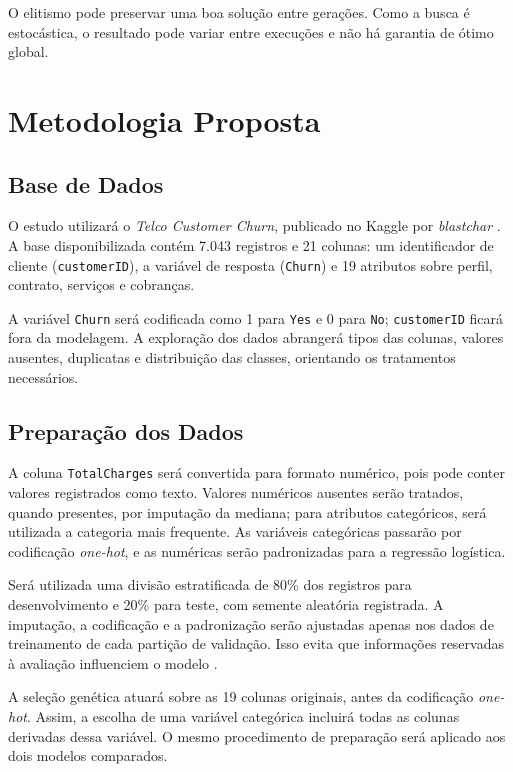 \documentclass[12pt]{article}
\begin{document}
O elitismo pode preservar uma boa solução entre gerações. Como a busca é
estocástica, o resultado pode variar entre execuções e não há garantia de
ótimo global.

\section{Metodologia Proposta}

\subsection{Base de Dados}

O estudo utilizará o \textit{Telco Customer Churn}, publicado no Kaggle por
\textit{blastchar} \cite{blastchartelco}. A base disponibilizada contém
7.043 registros e 21 colunas: um identificador de cliente
(\texttt{customerID}), a variável de resposta (\texttt{Churn}) e 19 atributos
sobre perfil, contrato, serviços e cobranças.

A variável \texttt{Churn} será codificada como 1 para \texttt{Yes} e 0 para
\texttt{No}; \texttt{customerID} ficará fora da modelagem. A exploração dos
dados abrangerá tipos das colunas, valores ausentes, duplicatas e distribuição
das classes, orientando os tratamentos necessários.

\subsection{Preparação dos Dados}

A coluna \texttt{TotalCharges} será convertida para formato numérico, pois
pode conter valores registrados como texto. Valores numéricos ausentes serão
tratados, quando presentes, por imputação da mediana; para atributos
categóricos, será utilizada a categoria mais frequente. As variáveis
categóricas passarão por codificação \textit{one-hot}, e as numéricas serão
padronizadas para a regressão logística.

Será utilizada uma divisão estratificada de 80\% dos registros para
desenvolvimento e 20\% para teste, com semente aleatória registrada. A imputação, a
codificação e a padronização serão ajustadas apenas nos dados de treinamento
de cada partição de validação. Isso evita que informações reservadas à
avaliação influenciem o modelo \cite{scikitlearnpitfalls}.

A seleção genética atuará sobre as 19 colunas originais, antes da codificação
\textit{one-hot}. Assim, a escolha de uma variável categórica incluirá todas
as colunas derivadas dessa variável. O mesmo procedimento de preparação será
aplicado aos dois modelos comparados.
\end{document}
